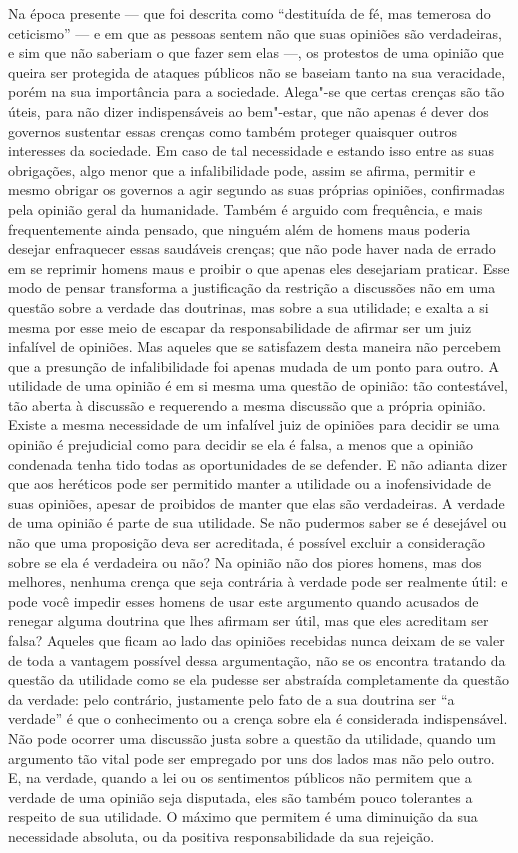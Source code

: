 Na época presente --- que foi descrita como ``destituída de fé, mas temerosa
do ceticismo'' --- e em que as pessoas sentem não que suas opiniões são
verdadeiras, e sim que não saberiam o que fazer sem elas ---, os
protestos de uma opinião que queira ser protegida de ataques públicos
não se baseiam tanto na sua veracidade, porém na sua importância para
a sociedade. Alega"-se que certas crenças são tão úteis, para não
dizer indispensáveis ao bem"-estar, que não apenas é dever dos governos
sustentar essas crenças como também proteger quaisquer outros
interesses da sociedade. Em caso de tal necessidade e estando 
isso entre as suas obrigações, algo menor que a infalibilidade pode, assim se
afirma, permitir e mesmo obrigar os governos a agir segundo as suas
próprias opiniões, confirmadas pela opinião geral da humanidade. Também
é arguido com frequência, e mais frequentemente ainda pensado, que
ninguém além de homens maus poderia desejar enfraquecer essas
saudáveis crenças; que não pode haver nada de errado em se reprimir
homens maus e proibir o que apenas eles desejariam praticar. Esse modo
de pensar transforma a justificação da restrição a  discussões não em uma
questão sobre a  verdade das doutrinas, mas sobre a sua utilidade; e exalta a
si mesma por esse meio de escapar da responsabilidade de
afirmar ser um juiz infalível de opiniões. Mas aqueles que se
satisfazem desta maneira não percebem que a presunção de infalibilidade
foi apenas mudada de um ponto para outro. A utilidade de uma opinião é
em si mesma uma questão de opinião: tão contestável, tão aberta à
discussão e requerendo a mesma discussão que a própria opinião. Existe
a mesma necessidade de um infalível juiz de opiniões para decidir se
uma opinião é prejudicial como para decidir se ela é falsa, a menos que
a opinião condenada tenha tido todas as oportunidades de se defender. E
não adianta dizer que aos heréticos pode ser permitido manter a
utilidade ou a inofensividade de suas opiniões, apesar de proibidos de
manter que elas são verdadeiras. A verdade de uma opinião é parte de
sua utilidade. Se não pudermos saber se é desejável ou não que uma
proposição deva ser acreditada, é possível excluir a consideração sobre
se ela é verdadeira ou não? Na opinião não dos piores homens, mas dos
melhores, nenhuma crença que seja contrária à verdade pode ser
realmente útil: e pode você impedir esses homens de usar este argumento
quando acusados de renegar alguma doutrina que lhes
afirmam ser útil, mas que eles acreditam ser falsa? Aqueles que ficam ao
lado das opiniões recebidas nunca deixam de se valer de toda a vantagem
possível dessa argumentação, não se os encontra tratando da questão da
utilidade como se ela pudesse ser abstraída completamente da questão da
verdade: pelo contrário, justamente pelo fato de a sua doutrina ser ``a verdade''
é que o conhecimento ou a crença sobre ela é considerada indispensável.
Não pode ocorrer uma discussão justa sobre a questão da utilidade,
quando um argumento tão vital pode ser empregado por uns dos lados mas
não pelo outro. E, na verdade, quando a lei ou os sentimentos públicos
não permitem que a verdade de uma opinião seja disputada, eles são
também pouco tolerantes a respeito de sua utilidade. O máximo que
permitem é uma diminuição da sua necessidade absoluta, ou da positiva
responsabilidade da sua rejeição. 

